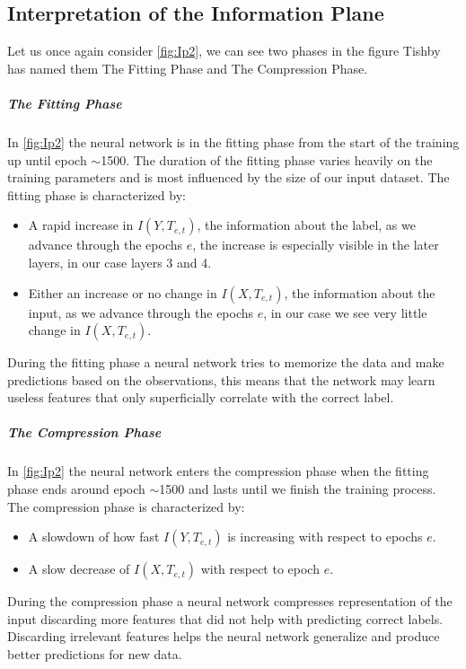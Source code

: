 \documentclass[dissertation.tex]{subfiles}
\begin{document}
\subsection{Interpretation of the Information Plane}

Let us once again consider \autoref{fig:Ip2}, we can see two phases in the figure
Tishby has named them The Fitting Phase and The Compression Phase.

\subparagraph{The Fitting Phase} In \autoref{fig:Ip2} the neural network is in
the fitting phase from the start of the training up until epoch $\sim$1500. The
duration of the fitting phase varies heavily on the training parameters and is
most influenced by the size of our input dataset. The fitting phase is
characterized by:
\begin{itemize}
  \item{
      A rapid increase in $I(Y, T_{e,t})$, the information about the label, as we
      advance through the epochs $e$, the increase is especially visible in the
      later layers, in our case layers 3 and 4.
    }
  \item{
      Either an increase or no change in $I(X, T_{e,t})$, the information about
      the input, as we advance through the epochs $e$, in our case we see very
      little change in $I(X,T_{e,t})$.
    }
\end{itemize}

During the fitting phase a neural network tries to memorize the data and make
predictions based on the observations, this means that the network may learn
useless features that only superficially correlate with the correct label.

\subparagraph{The Compression Phase} In \autoref{fig:Ip2} the neural network
enters the compression phase when the fitting phase ends around epoch $\sim$1500
and lasts until we finish the training process. The compression phase is
characterized by:
\begin{itemize}
  \item{
      A slowdown of how fast $I(Y, T_{e,t})$ is increasing with respect to epochs
      $e$. 
    }
  \item{
      A slow decrease of $I(X, T_{e,t})$ with respect to epoch $e$.
    }
\end{itemize}

During the compression phase a neural network compresses representation of the
input discarding more features that did not help with predicting correct labels.
Discarding irrelevant features helps the neural network generalize and produce
better predictions for new data. 
\end{document}
